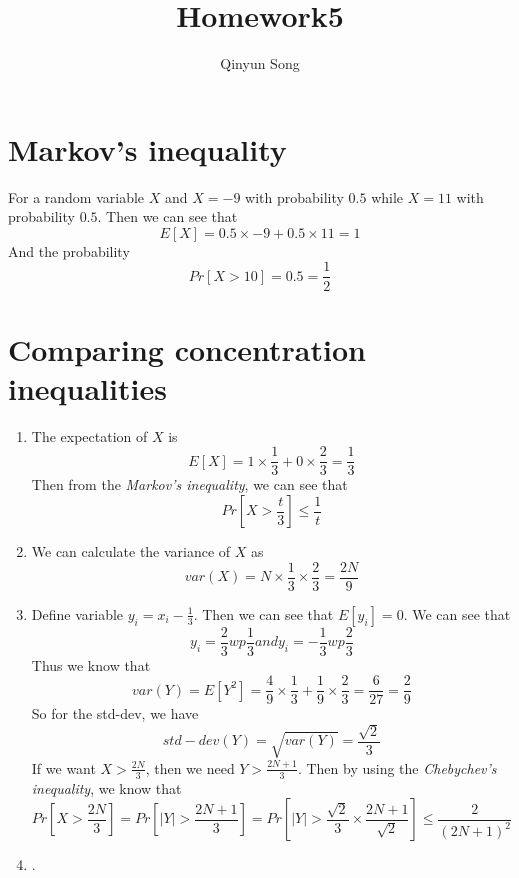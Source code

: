 \documentclass{article}
\title{Homework5}
\author{Qinyun Song}
\date{}
\begin{document}
	\maketitle

	\section{Markov's inequality}
		For a random variable $X$ and $X = -9$ with probability $0.5$ while $X = 11$ with probability $0.5$. Then we can see that \begin{equation}
		E[X] = 0.5 \times -9 + 0.5 \times 11 = 1
		\end{equation}
		And the probability \begin{equation}
			Pr \left[ X >  10 \right] = 0.5 = \frac{1}{2}
			\end{equation}

	\section{Comparing concentration inequalities}
		\begin{enumerate}
			\item The expectation of $X$ is \begin{equation}
				E\left[X\right] = 1 \times \frac{1}{3} + 0 \times \frac{2}{3} = \frac{1}{3}
				\end{equation}
				Then from the \emph{Markov's inequality}, we can see that \begin{equation}
				Pr \left[ X > \frac{t}{3}\right] \leq \frac{1}{t}
				\end{equation}
			\item We can calculate the variance of $X$ as \begin{equation}
					var(X) = N \times \frac{1}{3} \times \frac{2}{3} = \frac{2N}{9}
				\end{equation}
			\item Define variable $y_i = x_i - \frac{1}{3}$. Then we can see that $E\left[y_i\right] = 0$. We can see that \begin{equation}
			y_i = \frac{2}{3} wp \frac{1}{3} and y_i = -\frac{1}{3} wp \frac{2}{3}
			\end{equation}
			Thus we know that \begin{equation}
				var(Y) = E\left[Y^2\right] = \frac{4}{9} \times \frac{1}{3} + \frac{1}{9} \times \frac{2}{3} = \frac{6}{27} = \frac{2}{9}
			\end{equation}
			So for the std-dev, we have \begin{equation}
				std-dev(Y) = \sqrt{var(Y)} = \frac{\sqrt{2}}{3}
			\end{equation}
			If we want $X > \frac{2N}{3}$, then we need $Y > \frac{2N + 1}{3}$. Then by using the \emph{Chebychev's inequality}, we know that \begin{equation}
				Pr\left[ X > \frac{2N}{3}\right] = Pr\left[|Y| > \frac{2N + 1}{3}\right] = Pr\left[|Y| > \frac{\sqrt{2}}{3} \times \frac{2N + 1}{\sqrt{2}}\right] \leq \frac{2}{(2N + 1)^2}
			\end{equation}
			\item .
		\end{enumerate}
\end{document}
